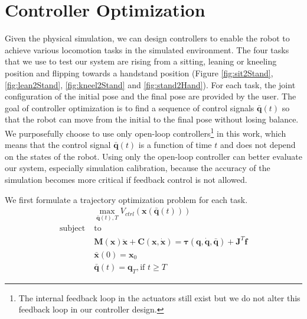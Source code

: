 \section{Controller Optimization}

Given the physical simulation, we can design controllers to enable the robot to achieve various locomotion tasks in the simulated environment. The four tasks that we use to test our system are rising from a sitting, leaning or kneeling position and flipping towards a handstand position (Figure \ref{fig:sit2Stand}, \ref{fig:lean2Stand}, \ref{fig:kneel2Stand} and \ref{fig:stand2Hand}). For each task, the joint configuration of the initial pose and the final pose are provided by the user. The goal of controller optimization is to find a sequence of control signals $\bar{\mathbf{q}}(t)$ so that the robot can move from the initial to the final pose without losing balance. We purposefully choose to use only open-loop controllers\footnote{The internal feedback loop in the actuators still exist but we do not alter this feedback loop in our controller design.} in this work, which means that the control signal $\bar{\mathbf{q}}(t)$ is a function of time $t$ and does not depend on the states of the robot. Using only the open-loop controller can better evaluate our system, especially simulation calibration, because the accuracy of the simulation becomes more critical if feedback control is not allowed.

We first formulate a trajectory optimization problem for each task.
\begin{align}
 \label{eqn:obj}&\max_{\bar{\mathbf{q}}(t),T} V_{ctrl}(\mathbf{x}(\bar{\mathbf{q}}(t)))\\
\nonumber  \mathrm{subject\;} &\mathrm{to} \\
\label{eqn:dyn1} & \mathbf{M}(\mathbf{x})\mathbf{\ddot{x}}+\mathbf{C}(\mathbf{x},\mathbf{\dot{x}}) =\boldsymbol{\tau}(\mathbf{q}, \dot{\mathbf{q}}, \bar{\mathbf{q}}) + \mathbf{J}^T\mathbf{f}\\
\label{eqn:boundary1}&\bar{\mathbf{x}}(0) = \mathbf{x}_0\\
\label{eqn:boundary2}&\bar{\mathbf{q}}(t) = \mathbf{q}_T, \text{if } t \geq T
\end{align}

